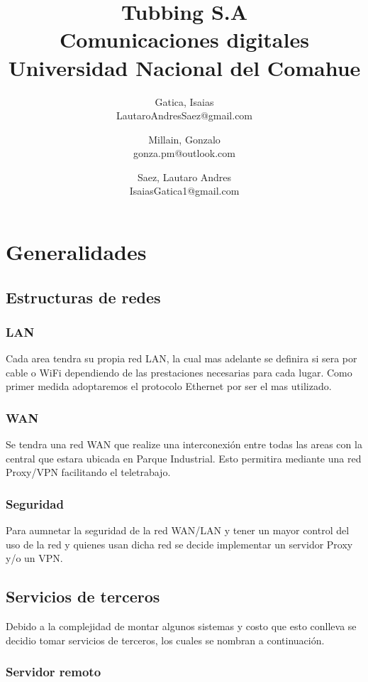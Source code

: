\documentclass[11pt,a4paper]{article}
\title{Tubbing S.A \\ \small{Comunicaciones digitales} \\ \small{Universidad Nacional del Comahue} }
\author{ 
        Gatica, Isaias \\ \small{LautaroAndresSaez@gmail.com} \and 
        Millain, Gonzalo \\ \small{gonza.pm@outlook.com} \and
        Saez, Lautaro Andres \\ \small{IsaiasGatica1@gmail.com} 

}
\date{}
\begin{document}
    \maketitle
    \section{Generalidades}
    
        \subsection{Estructuras de redes}

        \subsubsection*{LAN}

        Cada area tendra su propia red LAN, la cual mas adelante se definira si sera por cable o WiFi dependiendo de las 
        prestaciones necesarias para cada lugar. Como primer medida adoptaremos el protocolo Ethernet por ser el mas utilizado.

        \subsubsection*{WAN}

        Se tendra una red WAN que realize una interconexión entre todas las areas con la central que estara ubicada en Parque Industrial.
        Esto permitira mediante una red Proxy/VPN facilitando el teletrabajo.

        \subsubsection*{Seguridad}

        Para aumnetar la seguridad de la red WAN/LAN y tener un mayor control del uso de la red y quienes usan dicha red 
        se decide implementar un servidor Proxy y/o un VPN.

        \subsection{Servicios de terceros}

        Debido a la complejidad de montar algunos sistemas y costo que esto conlleva se decidio tomar servicios de terceros, los 
        cuales se nombran a continuación.

        \subsubsection*{Servidor remoto}
\end{document}
